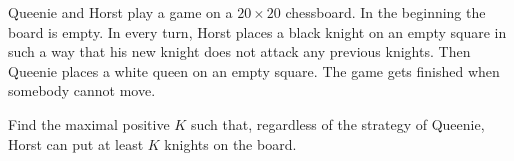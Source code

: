 Queenie and Horst play a game on a $20 \times 20$ chessboard. In the beginning the board is empty. In every turn, Horst places a black knight on an empty square in such a way that his new knight does not attack any previous knights. Then Queenie places a white queen on an empty square. The game gets finished when somebody cannot move.

Find the maximal positive $K$ such that, regardless of the strategy of Queenie, Horst can put at least $K$ knights on the board.
